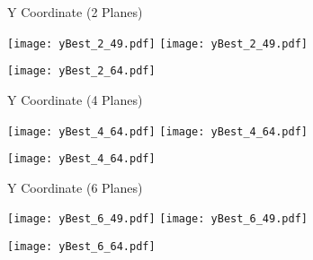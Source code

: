 \documentclass{beamer}
\begin{document}
\begin{frame}{Y Coordinate (2 Planes)}
\begin{adjustwidth}{-1.5em}{-1.5em}
	\texttt{[image: yBest\_2\_49.pdf]}
	\texttt{[image: yBest\_2\_49.pdf]} \\
	\begin{center} {\texttt{[image: yBest\_2\_64.pdf]}} \end{center}
\end{adjustwidth}
\end{frame}

\begin{frame}{Y Coordinate (4 Planes)}
\begin{adjustwidth}{-1.5em}{-1.5em}
	\texttt{[image: yBest\_4\_64.pdf]}
	\texttt{[image: yBest\_4\_64.pdf]} \\
	\begin{center} {\texttt{[image: yBest\_4\_64.pdf]}} \end{center}
\end{adjustwidth}
\end{frame}

\begin{frame}{Y Coordinate (6 Planes)}
\begin{adjustwidth}{-1.5em}{-1.5em}
	\texttt{[image: yBest\_6\_49.pdf]}
	\texttt{[image: yBest\_6\_49.pdf]} \\
	\begin{center} {\texttt{[image: yBest\_6\_64.pdf]}} \end{center}
\end{adjustwidth}
\end{frame}
\end{document}
